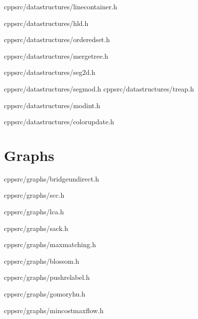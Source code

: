 \documentclass[portrait, 8pt, a4paper, oneside, twocolumn]{extarticle}
\begin{document}
    {}
    {}
    {cpp}{src/datastructures/linecontainer.h}
    \noindent\hrulefill

	{}
	{}
	{cpp}{src/datastructures/hld.h}
	\noindent\hrulefill

    {}
    {}
    {cpp}{src/datastructures/orderedset.h}
    \noindent\hrulefill

	{}
	{}
	{cpp}{src/datastructures/mergetree.h}
	\noindent\hrulefill

    
	{}
	{}
	{cpp}{src/datastructures/seg2d.h}
	\noindent\hrulefill


	{}
	{}
	{cpp}{src/datastructures/segmod.h}
	\noindent\hrulefill
    {}
    {}
    {cpp}{src/datastructures/treap.h}
    \noindent\hrulefill
	
	{}
	{}
	{cpp}{src/datastructures/modint.h}
	\noindent\hrulefill

	{}
	{}
	{cpp}{src/datastructures/colorupdate.h}
	\noindent\hrulefill

\section{Graphs}


    {}
	{}
	{cpp}{src/graphs/bridgeundirect.h}
	\noindent\hrulefill

    {}
	{}
	{cpp}{src/graphs/scc.h}
	\noindent\hrulefill


	{}
	{}
	{cpp}{src/graphs/lca.h}
	\noindent\hrulefill

	{}
	{}
	{cpp}{src/graphs/sack.h}
	\noindent\hrulefill

    {}
    {}
    {cpp}{src/graphs/maxmatching.h}
    \noindent\hrulefill

    {}
    {}
    {cpp}{src/graphs/blossom.h}
    \noindent\hrulefill

    {}
    {}
    {cpp}{src/graphs/pushrelabel.h}
    \noindent\hrulefill

    {}
    {}
    {cpp}{src/graphs/gomoryhu.h}
    \noindent\hrulefill

    {}
    {}
    {cpp}{src/graphs/mincostmaxflow.h}
    \noindent\hrulefill
\end{document}
